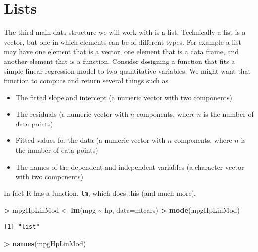 \documentclass[
]{krantz}
\makeatletter
\newenvironment{Shaded}{\begin{snugshade}}{\end{snugshade}}
\newcommand{\DataTypeTok}[1]{\textcolor[rgb]{0.27,0.27,0.27}{#1}}
\newcommand{\KeywordTok}[1]{\textcolor[rgb]{0.27,0.27,0.27}{\textbf{#1}}}
\newcommand{\NormalTok}[1]{#1}
\newcommand{\OperatorTok}[1]{\textcolor[rgb]{0.43,0.43,0.43}{\textbf{#1}}}
\newcommand{\StringTok}[1]{\textcolor[rgb]{0.5,0.5,0.5}{#1}}
\providecommand{\tightlist}{%
  \setlength{\itemsep}{0pt}\setlength{\parskip}{0pt}}
\newenvironment{kframe}{%
\medskip{}
\setlength{\fboxsep}{.8em}
 \def\at@end@of@kframe{}%
 \ifinner\ifhmode%
  \def\at@end@of@kframe{\end{minipage}}%
  \begin{minipage}{\columnwidth}%
 \fi\fi%
 \def\FrameCommand##1{\hskip\@totalleftmargin \hskip-\fboxsep
 \colorbox{shadecolor}{##1}\hskip-\fboxsep
     \hskip-\linewidth \hskip-\@totalleftmargin \hskip\columnwidth}%
 \MakeFramed {\advance\hsize-\width
   \@totalleftmargin\z@ \linewidth\hsize
   \@setminipage}}%
 {\par\unskip\endMakeFramed%
 \at@end@of@kframe}
\renewenvironment{Shaded}{\begin{kframe}}{\end{kframe}}
\makeatother
\begin{document}
\hypertarget{lists}{%
\section{Lists}\label{lists}}

The third main data structure we will work with is a list. Technically a list is a vector, but one in which elements can be of different types. For example a list may have one element that is a vector, one element that is a data frame, and another element that is a function. Consider designing a function that fits a simple linear regression model to two quantitative variables. We might want that function to compute and return several things such as

\begin{itemize}
\tightlist
\item
  The fitted slope and intercept (a numeric vector with two components)
\item
  The residuals (a numeric vector with \(n\) components, where \(n\) is the number of data points)
\item
  Fitted values for the data (a numeric vector with \(n\) components, where \(n\) is the number of data points)
\item
  The names of the dependent and independent variables (a character vector with two components)
\end{itemize}

In fact R has a function, \texttt{lm}, which does this (and much more).

\begin{Shaded}
\begin{Highlighting}[]
\OperatorTok{\textgreater{}}\StringTok{ }\NormalTok{mpgHpLinMod \textless{}{-}}\StringTok{ }\KeywordTok{lm}\NormalTok{(mpg }\OperatorTok{\textasciitilde{}}\StringTok{ }\NormalTok{hp, }\DataTypeTok{data=}\NormalTok{mtcars)}
\OperatorTok{\textgreater{}}\StringTok{ }\KeywordTok{mode}\NormalTok{(mpgHpLinMod)}
\end{Highlighting}
\end{Shaded}

\begin{verbatim}
[1] "list"
\end{verbatim}

\begin{Shaded}
\begin{Highlighting}[]
\OperatorTok{\textgreater{}}\StringTok{ }\KeywordTok{names}\NormalTok{(mpgHpLinMod)}
\end{Highlighting}
\end{Shaded}
\end{document}
